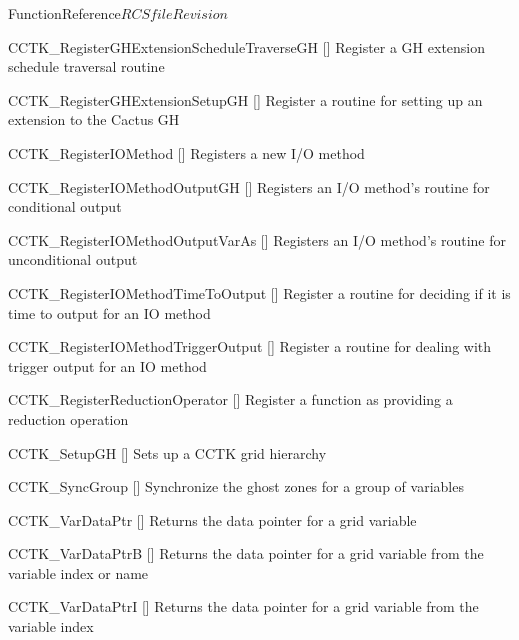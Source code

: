 \begin{cactuspart}{FunctionReference}{$RCSfile$}{$Revision$}
\begin{Lentry}
\item[CCTK\_RegisterGHExtensionScheduleTraverseGH]
  [\pageref{CCTK-RegisterGHExtensionScheduleTraverseGH}]
  Register a GH extension schedule traversal routine

\item[CCTK\_RegisterGHExtensionSetupGH]
  [\pageref{CCTK-RegisterGHExtensionSetupGH}]
  Register a routine for setting up an extension to the Cactus GH

\item[CCTK\_RegisterIOMethod]
  [\pageref{CCTK-RegisterIOMethod}]
  Registers a new I/O method

\item[CCTK\_RegisterIOMethodOutputGH]
  [\pageref{CCTK-RegisterIOMethodOutputGH}]
  Registers an I/O method's routine for conditional output

\item[CCTK\_RegisterIOMethodOutputVarAs]
  [\pageref{CCTK-RegisterIOMethodOutputVarAs}]
  Registers an I/O method's routine for unconditional output

\item[CCTK\_RegisterIOMethodTimeToOutput]
  [\pageref{CCTK-RegisterIOMethodTimeToOutput}]
  Register a routine for deciding if it is time to output for an IO method

\item[CCTK\_RegisterIOMethodTriggerOutput]
  [\pageref{CCTK-RegisterIOMethodTriggerOutput}]
  Register a routine for dealing with trigger output for an IO method

\item[CCTK\_RegisterReductionOperator]
  [\pageref{CCTK-RegisterReductionOperator}]
  Register a function as providing a reduction operation


\item[CCTK\_SetupGH]
  [\pageref{CCTK-SetupGH}]
  Sets up a CCTK grid hierarchy

\item[CCTK\_SyncGroup]
  [\pageref{CCTK-SyncGroup}]
  Synchronize the ghost zones for a group of variables


\item[CCTK\_VarDataPtr]
  [\pageref{CCTK-VarDataPtr}]
  Returns the data pointer for a grid variable

\item[CCTK\_VarDataPtrB]
  [\pageref{CCTK-VarDataPtrB}]
  Returns the data pointer for a grid variable from the variable index or name

\item[CCTK\_VarDataPtrI]
  [\pageref{CCTK-VarDataPtrI}]
  Returns the data pointer for a grid variable from the variable index


\end{Lentry}
\end{cactuspart}
